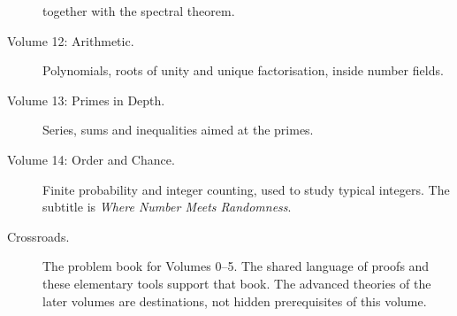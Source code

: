 \begin{description}
together with the spectral theorem.
\item[Volume 12: Arithmetic.] Polynomials, roots of unity and unique factorisation,
inside number fields.
\item[Volume 13: Primes in Depth.] Series, sums and inequalities aimed at the primes.
\item[Volume 14: Order and Chance.] Finite probability and integer counting,
used to study typical integers. The subtitle is \emph{Where Number Meets Randomness}.
\item[Crossroads.] The problem book for Volumes 0--5. The shared language of proofs and
these elementary tools support that book. The advanced theories of the later volumes
are destinations, not hidden prerequisites of this volume.
\end{description}
